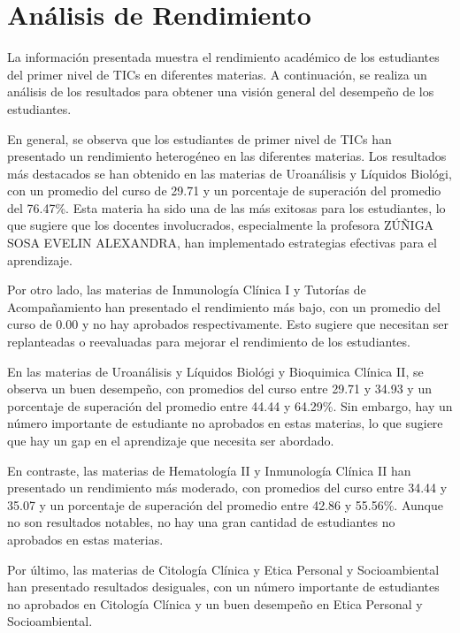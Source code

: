 \vspace{1cm}
\section{Análisis de Rendimiento}
La información presentada muestra el rendimiento académico de los estudiantes del primer nivel de TICs en diferentes materias. A continuación, se realiza un análisis de los resultados para obtener una visión general del desempeño de los estudiantes.

En general, se observa que los estudiantes de primer nivel de TICs han presentado un rendimiento heterogéneo en las diferentes materias. Los resultados más destacados se han obtenido en las materias de Uroanálisis y Líquidos Biológi, con un promedio del curso de 29.71 y un porcentaje de superación del promedio del 76.47\%. Esta materia ha sido una de las más exitosas para los estudiantes, lo que sugiere que los docentes involucrados, especialmente la profesora ZÚÑIGA SOSA EVELIN ALEXANDRA, han implementado estrategias efectivas para el aprendizaje.

Por otro lado, las materias de Inmunología Clínica I y Tutorías de Acompañamiento han presentado el rendimiento más bajo, con un promedio del curso de 0.00 y no hay aprobados respectivamente. Esto sugiere que necesitan ser replanteadas o reevaluadas para mejorar el rendimiento de los estudiantes.

En las materias de Uroanálisis y Líquidos Biológi y Bioquimica Clínica II, se observa un buen desempeño, con promedios del curso entre 29.71 y 34.93 y un porcentaje de superación del promedio entre 44.44 y 64.29\%. Sin embargo, hay un número importante de estudiante no aprobados en estas materias, lo que sugiere que hay un gap en el aprendizaje que necesita ser abordado.

En contraste, las materias de Hematología II y Inmunología Clínica II han presentado un rendimiento más moderado, con promedios del curso entre 34.44 y 35.07 y un porcentaje de superación del promedio entre 42.86 y 55.56\%. Aunque no son resultados notables, no hay una gran cantidad de estudiantes no aprobados en estas materias.

Por último, las materias de Citología Clínica y Etica Personal y Socioambiental han presentado resultados desiguales, con un número importante de estudiantes no aprobados en Citología Clínica y un buen desempeño en Etica Personal y Socioambiental.

